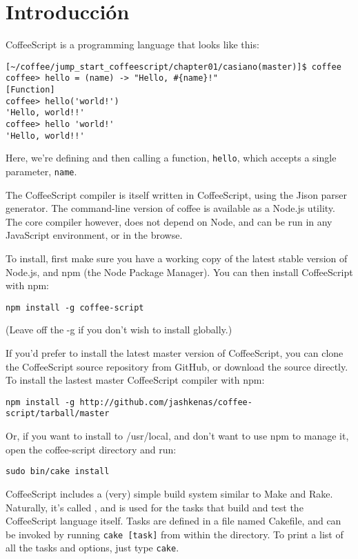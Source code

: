 
\section{Introducción}
CoffeeScript is a programming language that looks like this: 

\begin{verbatim}
[~/coffee/jump_start_coffeescript/chapter01/casiano(master)]$ coffee
coffee> hello = (name) -> "Hello, #{name}!"
[Function]
coffee> hello('world!')
'Hello, world!!'
coffee> hello 'world!'
'Hello, world!!'
\end{verbatim}

Here,
we’re defining and then calling a function, \verb|hello|, which accepts a
single parameter, \verb|name|.


The CoffeeScript compiler is itself written in CoffeeScript, using
the Jison parser generator. The command-line version of coffee is
available as a Node.js utility. The core compiler however, does not
depend on Node, and can be run in any JavaScript environment, or
in the browse.

To install, first make sure you have a working copy of the latest
stable version of Node.js, and npm (the Node Package Manager). You
can then install CoffeeScript with npm:

\begin{verbatim}
npm install -g coffee-script
\end{verbatim}
(Leave off the -g if you don't wish to install globally.)

If you'd prefer to install the latest master version of CoffeeScript,
you can clone the CoffeeScript source repository from GitHub, or
download the source directly. To install the lastest master
CoffeeScript compiler with npm:

\begin{verbatim}
npm install -g http://github.com/jashkenas/coffee-script/tarball/master
\end{verbatim}
Or, if you want to install to /usr/local, and don't want to use npm
to manage it, open the coffee-script directory and run:

\begin{verbatim}
sudo bin/cake install
\end{verbatim}

CoffeeScript includes a (very) simple build system similar to Make
and Rake. Naturally, it's called , and is used for the tasks
that build and test the CoffeeScript language itself. Tasks are
defined in a file named Cakefile, and can be invoked by running
\verb|cake [task]| from within the directory. To print a list of all the
tasks and options, just type \verb|cake|.

